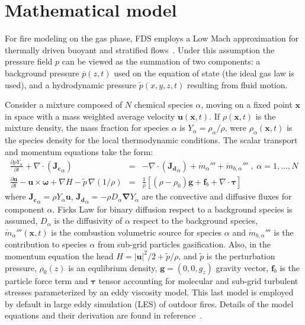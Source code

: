 \documentclass[journal,article,atmosphere,submit,moreauthors,pdftex]{Definitions/mdpi}
\begin{document}
\section{Mathematical model} \label{sec:matmodel}

For fire modeling on the gas phase, FDS employs a Low Mach approximation for thermally driven buoyant and stratified flows~\cite{Rehm:1}. Under this assumption the pressure field $p$ can be viewed as the summation of two components: a background pressure $\overline{p}(z,t)$ used on the equation of state (the ideal gas law is used), and a hydrodynamic pressure $\tilde{p}(x,y,z,t)$ resulting from fluid motion.

Consider a mixture composed of $N$ chemical species $\alpha$, moving on a fixed point $\mathbf{x}$ in space with a mass weighted average velocity $\mathbf{u}(\mathbf{x},t)$. If $\rho(\mathbf{x},t)$ is the mixture density, the mass fraction for species $\alpha$ is $Y_\alpha = \rho_\alpha / \rho$, were $\rho_\alpha(\mathbf{x},t)$ is the species density for the local thermodynamic conditions. The scalar transport and momentum equations take the form:
\begin{eqnarray}
   \frac{\partial \rho Y_\alpha}{ \partial t} + \nabla \cdot ( \mathbf{J_{c}}_\alpha ) &=& - \nabla \cdot (\mathbf{J_{d}}_\alpha) + \dot{m}_\alpha'''  +
    \dot{m}_{b,\alpha}'''\; , \; \alpha=1,\dots,N \label{eqn:spectran} \\
    \frac{\partial \mathbf{u}}{\partial t} - \mathbf{u} \times \boldsymbol{\omega} + \nabla H - \tilde{p} \, \nabla \left( 1/\rho\right) &=&
    \frac{1}{\rho} \left[ (\rho-\rho_0) \mathbf{g} + \mathbf{f}_{b} + \nabla \cdot \boldsymbol{\tau} \right] \label{eqn:momtran}
\end{eqnarray}
where $\mathbf{J_{c}}_\alpha=\rho Y_\alpha  \mathbf{u}$, $\mathbf{J_{d}}_\alpha=- \rho D_\alpha \boldsymbol{\nabla} Y_\alpha$ are the convective and diffusive fluxes for component $\alpha$. Ficks Law for binary diffusion respect to a background species is assumed, $D_\alpha$ is the diffusivity of $\alpha$ respect to the background species, $\dot{m}_\alpha'''(\mathbf{x},t)$ is the combustion volumetric source for species $\alpha$ and $ \dot{m}_{b,\alpha}'''$ is the contribution to species $\alpha$ from sub-grid particles gasification. Also, in the momentum equation the head $H=|\mathbf{u}|^2/2 + \tilde{p}/\rho$, and $\tilde{p}$ is the perturbation pressure, $\rho_0(z)$ is an equlibrium density, $\mathbf{g}=(0,0,g_z)$ gravity vector, $\mathbf{f}_{b}$ is the particle force term and $\boldsymbol{\tau}$ tensor accounting for molecular and sub-grid turbulent stresses parameterized by an eddy viscosity model. This last model is employed by default in large eddy simulation (LES) of outdoor fires. Details of the model equations and their derivation are found in reference~\cite{mcgratta_2013tr}.
\end{document}
